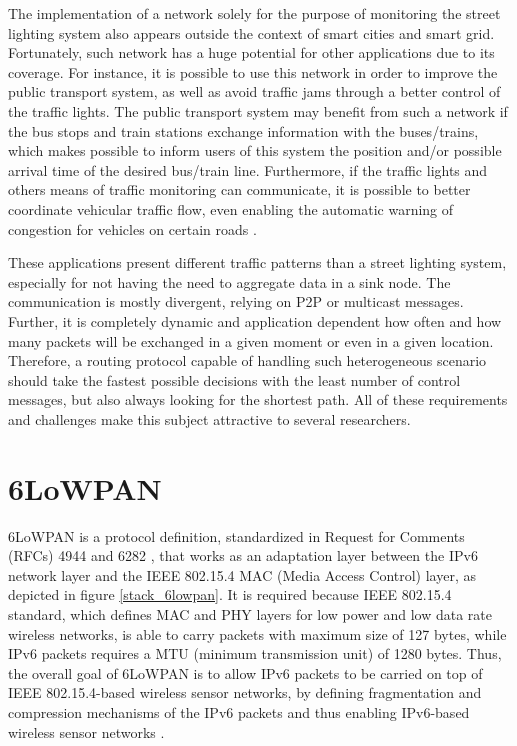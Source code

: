 \documentclass[final,authoryear,3p,twocolumn]{elsarticle}
\begin{document}
The implementation of a network solely for the purpose of monitoring the street lighting system also appears outside the context of smart cities and smart grid. Fortunately, such network has a huge potential for other applications due to its coverage. For instance, it is possible to use this network in order to improve the public transport system, as well as avoid traffic jams through a better control of the traffic lights. The public transport system may benefit from such a network if the bus stops and train stations exchange information with the buses/trains, which makes possible to inform users of this system the position and/or possible arrival time of the desired bus/train line. Furthermore, if the traffic lights and others means of traffic monitoring can communicate, it is possible to better coordinate vehicular traffic flow, even enabling the automatic warning of congestion for vehicles on certain roads \citep{SmartCity_ITS_2013}.

These applications present different traffic patterns than a street lighting system, especially for not having the need to aggregate data in a sink node. The communication is mostly divergent, relying on P2P or multicast messages. Further, it is completely dynamic and application dependent how often and how many packets will be exchanged in a given moment or even in a given location. Therefore, a routing protocol capable of handling such heterogeneous scenario should take the fastest possible decisions with the least number of control messages, but also always looking for the shortest path. All of these requirements and challenges make this subject attractive to several researchers.

\section{6LoWPAN}
\label{sec6LoWPAN}

6LoWPAN is a protocol definition, standardized in Request for Comments (RFCs) 4944 and 6282 \citep{RFC4944,RFC6282}, that works as an adaptation layer between the IPv6 network layer and the IEEE 802.15.4 MAC (Media Access Control) layer, as depicted in figure \ref{stack_6lowpan}. It is required because IEEE 802.15.4 standard, which defines MAC and PHY layers for low power and low data rate wireless networks, is able to carry packets with maximum size of 127 bytes, while IPv6 packets requires a MTU (minimum transmission unit) of 1280 bytes. Thus, the overall goal of 6LoWPAN is to allow IPv6 packets to be carried on top of IEEE 802.15.4-based wireless sensor networks, by defining fragmentation and compression mechanisms of the IPv6 packets and thus enabling IPv6-based wireless sensor networks \citep{Mulligan_6LoWPAN_2007}.
\end{document}
